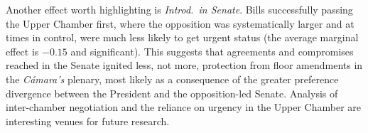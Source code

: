 \documentclass[letter,12pt]{article}
\begin{document}



Another effect worth highlighting is \emph{Introd.\ in Senate}. Bills successfully passing the Upper Chamber first, where the opposition was systematically larger and at times in control, were much less likely to get urgent status (the average marginal effect is $-0.15$ and significant). This suggests that agreements and compromises reached in the Senate ignited less, not more, protection from floor amendments in the \emph{Cámara's} plenary, most likely as a consequence of the greater preference divergence between the President and the opposition-led Senate. Analysis of inter-chamber negotiation and the reliance on urgency in the Upper Chamber are interesting venues for future research. 
\end{document}
